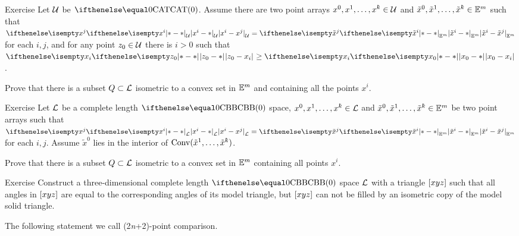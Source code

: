 \begin{thm}{Exercise}\label{ex:flat-in-CAT}
Let $\mathcal{U}$ be $\CAT0$. 
Assume there are two point arrays $x^0,x^1,\dots,x^\kay\in\spc{U}$ and $\tilde x^0,\tilde x^1,\dots,\tilde x^\kay\in\EE^m$ such that 
$\dist{x^i}{x^j}{\spc{U}}=\dist{\tilde x^i}{\tilde x^j}{\EE^m}$ for each $i,j$, and 
for any point $z_0\in\spc{U}$ there is $i>0$ such that $\dist{z_0}{x_i}{}\ge\dist{x_0}{x_i}{}$.

Prove that there is a subset $Q\subset\spc{L}$ isometric to a convex set in $\mathbb{E}^m$ and containing all the points $x^i$.
\end{thm}

\begin{thm}{Exercise}\label{ex:flat-in-CBB}
Let $\mathcal{L}$ be a complete length $\Alex{0}$ space,
$x^0,x^1,\dots,x^\kay\in\spc{L}$ and $\tilde x^0,\tilde x^1,\dots,\tilde x^\kay\in\EE^m$
be two point arrays such that 
$\dist{x^i}{x^j}{\spc{L}}=\dist{\tilde x^i}{\tilde x^j}{\EE^m}$ for each $i,j$.
Assume 
$\tilde x^0$ lies in the interior of $\Conv(\tilde x^1,\dots,\tilde x^\kay)$.

Prove that there is a subset $Q\subset\spc{L}$ isometric to a convex set in $\mathbb{E}^m$ containing all points $x^i$.
\end{thm}

{\sloppy 

\begin{thm}{Exercise} \label{ex:not-flat}
Construct  a three-dimensional complete length $\Alex0$ space $\mathcal{L}$ with a triangle 
$[{x}{y}{z}]$ such that all angles in $[{x}{y}{z}]$ are equal to the corresponding angles of its model triangle, but $[{x}{y}{z}]$  can not be filled by an isometric copy of the model solid triangle.
\end{thm}

}

The following statement we call (2\textit{n}+2)-point comparison.

